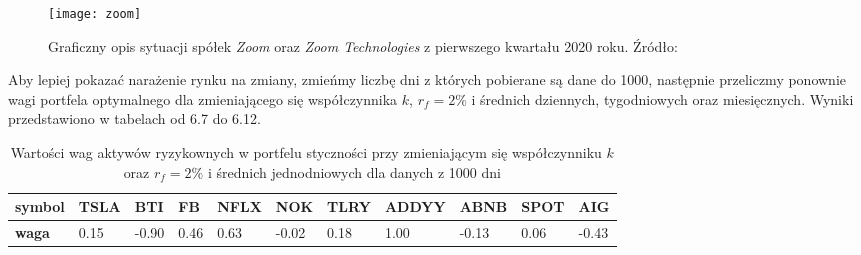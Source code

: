 \documentclass[magister]{dyplom}
\begin{document}
\begin{figure}[ht]
	\centering
	\texttt{[image: zoom]}
	\caption{Graficzny opis sytuacji spółek \textit{Zoom} oraz \textit{Zoom Technologies} z pierwszego kwartału 2020 roku. Źródło:\cite{zoominvest}}
\end{figure}
\newpage
Aby lepiej pokazać narażenie rynku na zmiany, zmieńmy liczbę dni z których pobierane są dane do 1000, następnie przeliczmy ponownie wagi portfela optymalnego dla zmieniającego się współczynnika $k$, $r_f = 2\%$ i średnich dziennych, tygodniowych oraz miesięcznych. Wyniki przedstawiono w tabelach od 6.7 do 6.12.
\begin{table}[ht]
	\centering
	\caption{Wartości wag aktywów ryzykownych w portfelu styczności przy zmieniającym się współczynniku $k$ oraz $r_f = 2\%$ i średnich jednodniowych dla danych z 1000 dni}
	\begin{tabular}{|l|l|l|l|l|l|l|l|l|l|l|}
		\hline
		\textbf{symbol} & \textbf{TSLA} & \textbf{BTI} & \textbf{FB} & \textbf{NFLX} & \textbf{NOK} & \textbf{TLRY} & \textbf{ADDYY} & \textbf{ABNB} & \textbf{SPOT} & \textbf{AIG} \\ \hline
		\textbf{waga}   & 0.15       & -0.90          & 0.46           & 0.63        & -0.02         & 0.18         & 1.00        & -0.13          & 0.06          & -0.43        \\ \hline
	\end{tabular}
\end{table}
\end{document}
